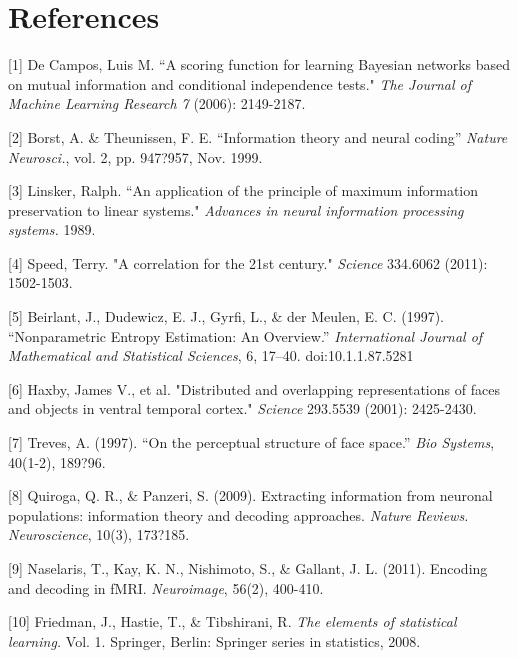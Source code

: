 \documentclass{article}
\begin{document}


\section*{References}

\small

[1] De Campos, Luis M. ``A scoring function for learning Bayesian networks
based on mutual information and conditional independence tests." \emph{The
Journal of Machine Learning Research 7} (2006): 2149-2187.

[2] Borst, A. \& Theunissen, F. E. ``Information theory and neural coding''
\emph{Nature Neurosci.}, vol. 2, pp. 947?957, Nov. 1999.

[3] Linsker, Ralph. ``An application of the principle of maximum
information preservation to linear systems." \emph{Advances in neural
information processing systems.} 1989.

[4] Speed, Terry. "A correlation for the 21st century." \emph{Science}
334.6062 (2011): 1502-1503.

[5] Beirlant, J., Dudewicz, E. J., Gyrfi, L., \& der Meulen,
E. C. (1997). ``Nonparametric Entropy Estimation: An
Overview.'' \emph{International Journal of Mathematical and Statistical
Sciences}, 6, 17–40. doi:10.1.1.87.5281

[6] Haxby, James V., et al. "Distributed and overlapping representations of faces and objects in ventral temporal cortex." \emph{Science} 293.5539 (2001): 2425-2430.

[7] Treves, A. (1997). ``On the perceptual structure of face space.'' \emph{Bio Systems}, 40(1-2), 189?96. 

[8] Quiroga, Q. R., \& Panzeri, S. (2009). Extracting information from neuronal populations: information theory and decoding approaches. \emph{Nature Reviews. Neuroscience}, 10(3), 173?185.

[9] Naselaris, T., Kay, K. N., Nishimoto, S., \& Gallant,
J. L. (2011). Encoding and decoding in fMRI. \emph{Neuroimage}, 56(2),
400-410.

[10] Friedman, J., Hastie, T., \& Tibshirani, R. \emph{The elements
of statistical learning.} Vol. 1. Springer, Berlin: Springer series in
statistics, 2008.
\end{document}
